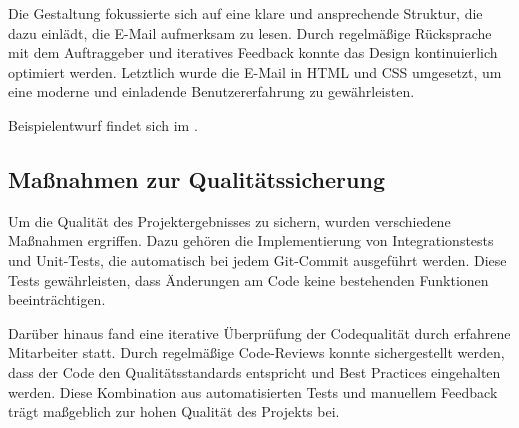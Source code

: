 Die Gestaltung fokussierte sich auf eine klare und ansprechende Struktur, die dazu einlädt, die E-Mail aufmerksam zu lesen. Durch regelmäßige Rücksprache mit dem Auftraggeber und iteratives Feedback konnte das Design kontinuierlich optimiert werden. Letztlich wurde die E-Mail in HTML und CSS umgesetzt, um eine moderne und einladende Benutzererfahrung zu gewährleisten.

Beispielentwurf findet sich im .


\subsection{Maßnahmen zur Qualitätssicherung}
\label{sec:Qualitaetssicherung}

Um die Qualität des Projektergebnisses zu sichern, wurden verschiedene Maßnahmen ergriffen. Dazu gehören die Implementierung von Integrationstests und Unit-Tests, die automatisch bei jedem Git-Commit ausgeführt werden. Diese Tests gewährleisten, dass Änderungen am Code keine bestehenden Funktionen beeinträchtigen.

Darüber hinaus fand eine iterative Überprüfung der Codequalität durch erfahrene Mitarbeiter statt. Durch regelmäßige Code-Reviews konnte sichergestellt werden, dass der Code den Qualitätsstandards entspricht und Best Practices eingehalten werden. Diese Kombination aus automatisierten Tests und manuellem Feedback trägt maßgeblich zur hohen Qualität des Projekts bei.


